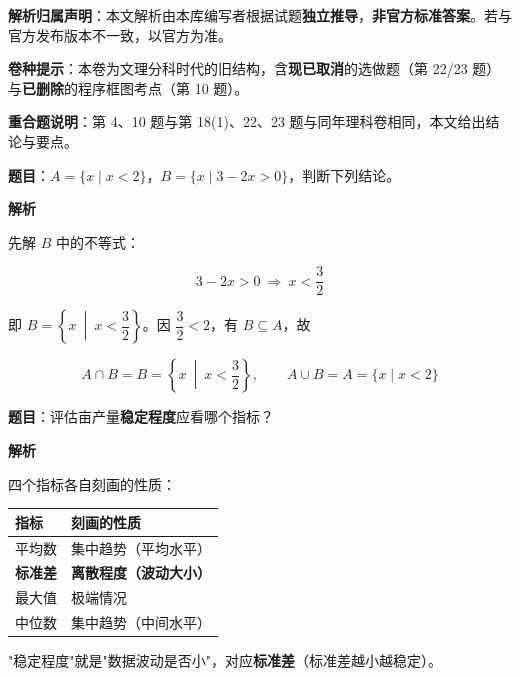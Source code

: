 

\begin{gknotice}
\textbf{ 解析归属声明}：本文解析由本库编写者根据试题\textbf{独立推导}，\textbf{非官方标准答案}。若与官方发布版本不一致，以官方为准。

\textbf{ 卷种提示}：本卷为文理分科时代的旧结构，含\textbf{现已取消}的选做题（第 22/23 题）与\textbf{已删除}的程序框图考点（第 10 题）。

\textbf{重合题说明}：第 4、10 题与第 18(1)、22、23 题与同年理科卷相同，本文给出结论与要点。
\end{gknotice}

\par\medskip



\textbf{题目}：$A=\{x\mid x<2\}$，$B=\{x\mid3-2x>0\}$，判断下列结论。

\textbf{解析}

先解 $B$ 中的不等式：

\[3-2x>0\ \Longrightarrow\ x<\frac32\]

即 $B=\left\{x\ \middle|\ x<\dfrac32\right\}$。因 $\dfrac32<2$，有 $B\subseteq A$，故

\[A\cap B=B=\left\{x\ \middle|\ x<\frac32\right\},\qquad A\cup B=A=\{x\mid x<2\}\]


\par\medskip


\textbf{题目}：评估亩产量\textbf{稳定程度}应看哪个指标？

\textbf{解析}

四个指标各自刻画的性质：

\begin{center}
\begin{tabular}{ll}
\toprule
指标 & 刻画的性质 \\
\midrule
平均数 & 集中趋势（平均水平） \\
\textbf{标准差} & \textbf{离散程度（波动大小）} \\
最大值 & 极端情况 \\
中位数 & 集中趋势（中间水平） \\
\bottomrule
\end{tabular}
\end{center}

"稳定程度"就是"数据波动是否小"，对应\textbf{标准差}（标准差越小越稳定）。

